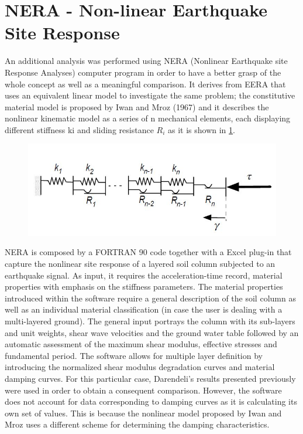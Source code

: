 \documentclass[10pt,a4paper]{report}
\begin{document}
\section{NERA - Non-linear Earthquake Site Response}
An additional analysis was performed using NERA (Nonlinear Earthquake site Response Analyses) computer program in order to have a better grasp of the whole concept as well as a meaningful comparison. It derives from EERA that uses an equivalent linear model to investigate the same problem; the constitutive material model is proposed by Iwan and Mroz (1967) and it describes the nonlinear kinematic model as a series of n mechanical elements, each displaying different stiffness ki and sliding resistance $R_i$ as it is shown in \ref{Mroz}.
\begin{figure}[h!]
	\centering
	\includegraphics[width=0.7\linewidth]{"Mroz"}
	\caption[Plastic description of Iwan$&$Mroz nonlinear model]{}
	\caption{}
	\label{Mroz}
\end{figure}

NERA is composed by a FORTRAN 90 code together with a Excel plug-in that capture the nonlinear site response of a layered soil column subjected to an earthquake signal. As input, it requires the acceleration-time record, material properties with emphasis on the stiffness parameters. 
The material properties introduced within the software require a general description of the soil column as well as an individual material classification (in case the user is dealing with a multi-layered ground). The general input portrays the column with its sub-layers and unit weights, shear wave velocities and the ground water table followed by an automatic assessment of the maximum shear modulus, effective stresses and fundamental period. 
The software allows for multiple layer definition by introducing the normalized shear modulus degradation curves and material damping curves. For this particular case, Darendeli's results presented previously were used in order to obtain a consequent comparison. However, the software does not account for data corresponding to damping curves as it is calculating its own set of values. This is because the nonlinear model proposed by Iwan and Mroz uses a different scheme for determining the damping characteristics.
\end{document}
